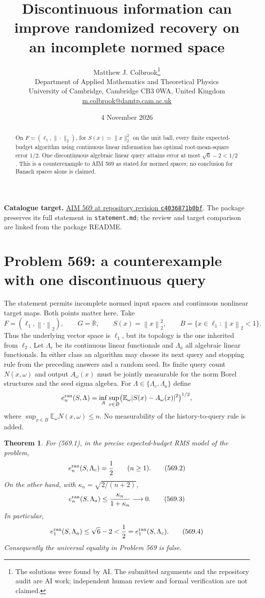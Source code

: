 \documentclass[11pt,a4paper]{article}
\title{Discontinuous information can improve randomized recovery on an incomplete normed space}
\author{Matthew J. Colbrook\thanks{The solutions were found by AI. The submitted arguments and the repository audit are AI work; independent human review and formal verification are not claimed.}\\[4pt]
\small Department of Applied Mathematics and Theoretical Physics\\
\small University of Cambridge, Cambridge CB3 0WA, United Kingdom\\
\small\href{mailto:m.colbrook@damtp.cam.ac.uk}{m.colbrook@damtp.cam.ac.uk}}
\date{4 November 2026}
\newcommand{\R}{\mathbb R}
\newcommand{\E}{\mathbb E}
\newcommand{\norm}[1]{\left\lVert#1\right\rVert}
\newtheorem{theorem}{Theorem}[section]
\theoremstyle{definition}
\theoremstyle{remark}
\numberwithin{equation}{section}
\begin{document}
\maketitle
\begin{abstract}
On $F=(\ell_1,\|\cdot\|_2)$, for $S(x)=\|x\|_2^2$ on the unit ball, every finite expected-budget algorithm using continuous linear information has optimal root-mean-square error $1/2$. One discontinuous algebraic linear query attains error at most $\sqrt6-2<1/2$. This is a counterexample to AIM 569 as stated for normed spaces; no conclusion for Banach spaces alone is claimed.
\end{abstract}
\noindent\textbf{Catalogue target.} \href{https://github.com/MColbrook/AIM/blob/c4036871b0bf15cbc83e79c780b7191bcbb2cfed/problems/569-does-discontinuous-information-help-randomized-approximation.md}{AIM 569 at repository revision \texttt{c4036871b0bf}}. The package preserves its full statement in \texttt{statement.md}; the review and target comparison are linked from the package README.
\medskip

\section{Problem 569: a counterexample with one discontinuous query}
\label{sec:569}

The statement permits incomplete normed input spaces and continuous
nonlinear target maps. Both points matter here. Take
\[
 F=(\ell_1,\norm{\cdot}_2),\qquad G=\R,\qquad
 S(x)=\norm x_2^2,\qquad B=\{x\in\ell_1:\norm x_2<1\}.
 \tag{569.1}
\]
Thus the underlying vector space is \(\ell_1\), but its topology is
the one inherited from \(\ell_2\). Let $\Lambda_c$ be its continuous linear functionals and $\Lambda_a$ all algebraic linear functionals. In either class an algorithm may choose its next query and stopping rule from the preceding answers and a random seed. Its finite query count $N(x,\omega)$ and output $A_\omega(x)$ must be jointly measurable for the norm Borel structures and the seed sigma algebra. For $\Lambda\in\{\Lambda_c,\Lambda_a\}$ define
\[
e_n^{\rm ran}(S,\Lambda)=\inf_A\sup_{x\in B}\bigl(\E_\omega|S(x)-A_\omega(x)|^2\bigr)^{1/2},
\]
where $\sup_{x\in B}\E_\omega N(x,\omega)\le n$. No measurability of the history-to-query rule is added.

\begin{theorem}
\label{thm:569}
For (569.1), in the precise expected-budget RMS model of the problem,
\[
 e_n^{\rm ran}(S,\Lambda_c)=\frac12\qquad(n\ge1).
 \tag{569.2}
\]
On the other hand, with \(\kappa_n=\sqrt{2/(n+2)}\),
\[
 e_n^{\rm ran}(S,\Lambda_a)
           \le\frac{\kappa_n}{1+\kappa_n}\longrightarrow0 .
 \tag{569.3}
\]
In particular,
\[
 e_1^{\rm ran}(S,\Lambda_a)
          \le\sqrt6-2<\frac12
          =e_1^{\rm ran}(S,\Lambda_c).
 \tag{569.4}
\]
Consequently the universal equality in Problem 569 is false.
\end{theorem}
\end{document}
